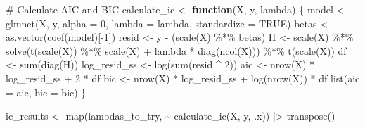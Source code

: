 \documentclass[
  letterpaper,
]{book}
\newenvironment{Shaded}{\begin{snugshade}}{\end{snugshade}}
\newcommand{\AttributeTok}[1]{\textcolor[rgb]{0.40,0.45,0.13}{#1}}
\newcommand{\CommentTok}[1]{\textcolor[rgb]{0.37,0.37,0.37}{#1}}
\newcommand{\ConstantTok}[1]{\textcolor[rgb]{0.56,0.35,0.01}{#1}}
\newcommand{\ControlFlowTok}[1]{\textcolor[rgb]{0.00,0.23,0.31}{\textbf{#1}}}
\newcommand{\DecValTok}[1]{\textcolor[rgb]{0.68,0.00,0.00}{#1}}
\newcommand{\FunctionTok}[1]{\textcolor[rgb]{0.28,0.35,0.67}{#1}}
\newcommand{\NormalTok}[1]{\textcolor[rgb]{0.00,0.23,0.31}{#1}}
\newcommand{\OtherTok}[1]{\textcolor[rgb]{0.00,0.23,0.31}{#1}}
\newcommand{\SpecialCharTok}[1]{\textcolor[rgb]{0.37,0.37,0.37}{#1}}
\begin{document}
\begin{Shaded}
\begin{Highlighting}[]
\CommentTok{\# Calculate AIC and BIC}
\NormalTok{calculate\_ic }\OtherTok{\textless{}{-}} \ControlFlowTok{function}\NormalTok{(X, y, lambda) \{}
\NormalTok{  model }\OtherTok{\textless{}{-}} \FunctionTok{glmnet}\NormalTok{(X, y, }\AttributeTok{alpha =} \DecValTok{0}\NormalTok{, }\AttributeTok{lambda =}\NormalTok{ lambda,}
                  \AttributeTok{standardize =} \ConstantTok{TRUE}\NormalTok{)}
\NormalTok{  betas }\OtherTok{\textless{}{-}} \FunctionTok{as.vector}\NormalTok{(}\FunctionTok{coef}\NormalTok{(model)[}\SpecialCharTok{{-}}\DecValTok{1}\NormalTok{])}
\NormalTok{  resid }\OtherTok{\textless{}{-}}\NormalTok{ y }\SpecialCharTok{{-}}\NormalTok{ (}\FunctionTok{scale}\NormalTok{(X) }\SpecialCharTok{\%*\%}\NormalTok{ betas)}
\NormalTok{  H }\OtherTok{\textless{}{-}} \FunctionTok{scale}\NormalTok{(X) }\SpecialCharTok{\%*\%}
    \FunctionTok{solve}\NormalTok{(}\FunctionTok{t}\NormalTok{(}\FunctionTok{scale}\NormalTok{(X)) }\SpecialCharTok{\%*\%} \FunctionTok{scale}\NormalTok{(X) }\SpecialCharTok{+}\NormalTok{ lambda }\SpecialCharTok{*}
            \FunctionTok{diag}\NormalTok{(}\FunctionTok{ncol}\NormalTok{(X))) }\SpecialCharTok{\%*\%} \FunctionTok{t}\NormalTok{(}\FunctionTok{scale}\NormalTok{(X))}
\NormalTok{  df }\OtherTok{\textless{}{-}} \FunctionTok{sum}\NormalTok{(}\FunctionTok{diag}\NormalTok{(H))}
\NormalTok{  log\_resid\_ss }\OtherTok{\textless{}{-}} \FunctionTok{log}\NormalTok{(}\FunctionTok{sum}\NormalTok{(resid }\SpecialCharTok{\^{}} \DecValTok{2}\NormalTok{))}
\NormalTok{  aic }\OtherTok{\textless{}{-}} \FunctionTok{nrow}\NormalTok{(X) }\SpecialCharTok{*}\NormalTok{ log\_resid\_ss }\SpecialCharTok{+} \DecValTok{2} \SpecialCharTok{*}\NormalTok{ df}
\NormalTok{  bic }\OtherTok{\textless{}{-}} \FunctionTok{nrow}\NormalTok{(X) }\SpecialCharTok{*}\NormalTok{ log\_resid\_ss }\SpecialCharTok{+} \FunctionTok{log}\NormalTok{(}\FunctionTok{nrow}\NormalTok{(X)) }\SpecialCharTok{*}\NormalTok{ df}
  \FunctionTok{list}\NormalTok{(}\AttributeTok{aic =}\NormalTok{ aic, }\AttributeTok{bic =}\NormalTok{ bic)}
\NormalTok{\}}

\NormalTok{ic\_results }\OtherTok{\textless{}{-}} \FunctionTok{map}\NormalTok{(lambdas\_to\_try, }\SpecialCharTok{\textasciitilde{}} \FunctionTok{calculate\_ic}\NormalTok{(X, y, .x)) }\SpecialCharTok{|\textgreater{}}
  \FunctionTok{transpose}\NormalTok{()}
\end{Highlighting}
\end{Shaded}
\end{document}
